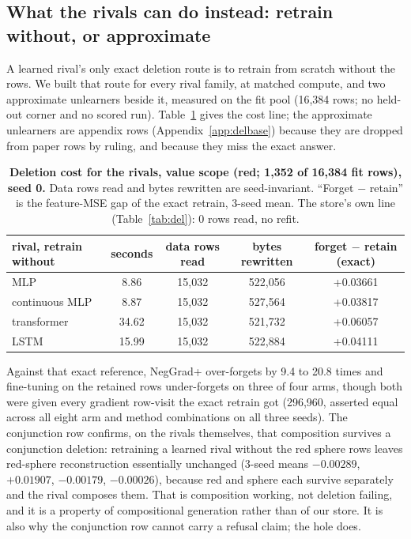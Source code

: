 \documentclass{article} %
\begin{document}
\subsection{What the rivals can do instead: retrain without, or approximate}
\label{sec:del-comparators}

A learned rival's only exact deletion route is to retrain from scratch without the rows. We
built that route for every rival family, at matched compute, and two approximate unlearners
beside it, measured on the fit pool (16,384 rows; no held-out corner and no scored run).
Table~\ref{tab:rivals-del} gives the cost line; the approximate unlearners are appendix rows
(Appendix~\ref{app:delbase}) because they are dropped from paper rows by ruling, and because
they miss the exact answer.

\begin{table}[t]
\centering\small
\caption{\textbf{Deletion cost for the rivals, value scope (red; 1,352 of 16,384 fit rows),
seed 0.} Data rows read and bytes rewritten are seed-invariant. ``Forget $-$ retain'' is the
feature-MSE gap of the exact retrain, 3-seed mean. The store's own line (Table~\ref{tab:del}):
0 rows read, no refit.}
\label{tab:rivals-del}
\begin{tabular}{lcccc}
\toprule
rival, retrain without & seconds & data rows read & bytes rewritten & forget $-$ retain (exact) \\
\midrule
MLP & 8.86 & 15,032 & 522,056 & +0.03661 \\
continuous MLP & 8.87 & 15,032 & 527,564 & +0.03817 \\
transformer & 34.62 & 15,032 & 521,732 & +0.06057 \\
LSTM & 15.99 & 15,032 & 522,884 & +0.04111 \\
\bottomrule
\end{tabular}
\end{table}

\noindent Against that exact reference, NegGrad+ over-forgets by 9.4 to 20.8 times and
fine-tuning on the retained rows under-forgets on three of four arms, though both were given
every gradient row-visit the exact retrain got (296,960, asserted equal across all eight arm
and method combinations on all three seeds). %
The conjunction row confirms, on the rivals themselves, that composition survives a
conjunction deletion: retraining a learned rival without the red sphere rows leaves red-sphere
reconstruction essentially unchanged (3-seed means $-0.00289$, $+0.01907$, $-0.00179$,
$-0.00026$), because red and sphere each survive separately and the rival composes them.
That is composition working, not deletion failing, and it is a property of compositional
generation rather than of our store. It is also why the conjunction row cannot carry a
refusal claim; the hole does.
\end{document}
